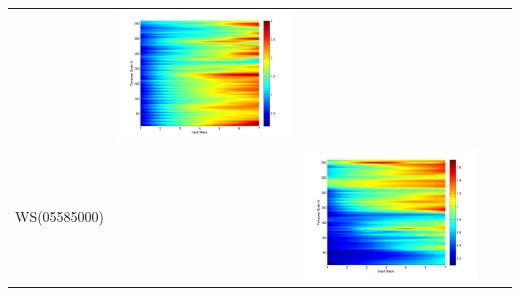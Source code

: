 \documentclass[11pt]{article}
\begin{document}
\begin{table}[H]
{\begin{tabular}{ccccc}
&\begin{minipage}{.3\textwidth}\includegraphics[width=\linewidth]{resultgraph/02143000pepq.png}\end{minipage}
\\
\multirow{8}{*}{WS(05585000)}&
&\begin{minipage}{.3\textwidth}\includegraphics[width=\linewidth]{resultgraph/05585000p.png}\end{minipage}

\end{tabular}}
\end{table}
\end{document}
